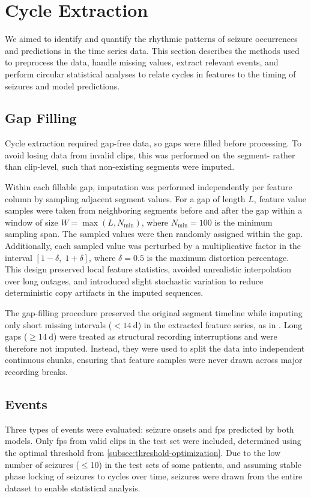 

\section{Cycle Extraction} \label{sec:cycle-extraction}

We aimed to identify and quantify the rhythmic patterns of seizure occurrences and predictions in the time series data.
This section describes the methods used to preprocess the data, handle missing values, extract relevant events, and perform circular statistical analyses to relate cycles in features to the timing of seizures and model predictions.

\subsection{Gap Filling} \label{subsec:gap-filling}
Cycle extraction required gap-free data, so gaps were filled before processing.
To avoid losing data from invalid clips, this was performed on the segment- rather than clip-level, such that non-existing segments were imputed.

Within each fillable gap, imputation was performed independently per feature column by sampling adjacent segment values.
For a gap of length $L$, feature value samples were taken from neighboring segments before and after the gap within a window of size $W=\max(L, N_{\min})$, where $N_{\min}=100$ is the minimum sampling span.
The sampled values were then randomly assigned within the gap.
Additionally, each sampled value was perturbed by a multiplicative factor in the interval $[1-\delta,\;1+\delta]$, where $\delta=0.5$ is the maximum distortion percentage.
This design preserved local feature statistics, avoided unrealistic interpolation over long outages, and introduced slight stochastic variation to reduce deterministic copy artifacts in the imputed sequences.

The gap-filling procedure preserved the original segment timeline while imputing only short missing intervals ($<\SI{14}{\day}$) in the extracted feature series, as in \textcite{yang_seizure_2024}.
Long gaps ($\geq\SI{14}{\day}$) were treated as structural recording interruptions and were therefore not imputed.
Instead, they were used to split the data into independent continuous chunks, ensuring that feature samples were never drawn across major recording breaks.


\subsection{Events} \label{subsec:cycle-events}
Three types of events were evaluated: seizure onsets and \glspl{fp} predicted by both models.
Only \glspl{fp} from valid clips in the test set were included, determined using the optimal threshold from \cref{subsec:threshold-optimization}.
Due to the low number of seizures ($\leq$10) in the test sets of some patients, and assuming stable phase locking of seizures to cycles over time, seizures were drawn from the entire dataset to enable statistical analysis.



